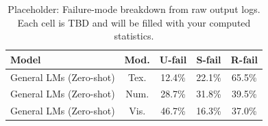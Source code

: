 \begin{table}[t]
    \centering
    \caption{Placeholder: Failure-mode breakdown from raw output logs. Each cell is TBD and will be filled with your computed statistics.}
    \label{tab:failure_modes_placeholder}
    \renewcommand{\arraystretch}{1.15}
    \setlength{\tabcolsep}{6pt}
    \begin{tabular}{l c c c c}
        \toprule
        \textbf{Model} & \textbf{Mod.} & \textbf{U-fail} & \textbf{S-fail} & \textbf{R-fail} \\
        \midrule
        General LMs (Zero-shot) & Tex. & 12.4\% & 22.1\% & 65.5\% \\
        General LMs (Zero-shot) & Num. & 28.7\% & 31.8\% & 39.5\% \\
        General LMs (Zero-shot) & Vis. & 46.7\% & 16.3\% & 37.0\% \\
        \bottomrule
    \end{tabular}
\end{table}





